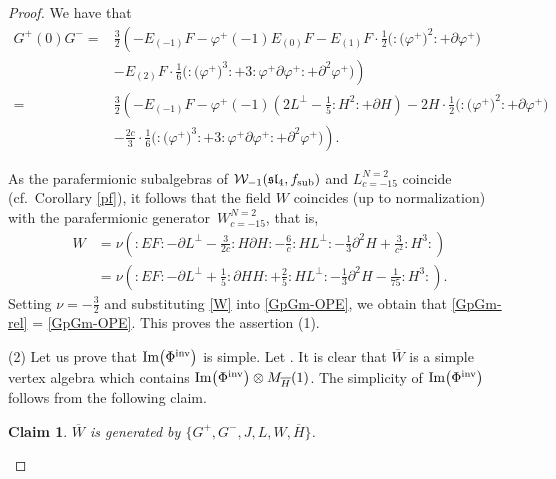 \documentclass[11pt]{article}
\numberwithin{equation}{section}
\newcommand{\F}{\mathcal F}
\newtheorem{Claim}[Theorem]{Claim}
\begin{document}
\begin{proof}
We have that
 \begin{align}
G^+(0) G^-={}& \frac{3}{2}\left(-E_{(-1)}F -\varphi^+(-1) E_{(0)}F - E_{(1)}F\cdot \frac{1}{2}\bigl({:}\bigl(\varphi^+\bigr)^2{:}+\partial \varphi^+\bigr) \right. \nonumber\\
&\left. - E_{(2)}F\cdot \frac{1}{6}\bigl({:} \bigl(\varphi^+ \bigr)^3 {:}+3{:}\varphi ^+ \partial \varphi^+{:} + \partial ^2 \varphi^+\bigr) \right) \nonumber\\
={}& \frac{3}{2}\left(-E_{(-1)}F -\varphi^+(-1) \left(2L^{\perp} - \frac{1}{5}{:}H^2{:} +\partial H\right) - 2H\cdot\frac{1}{2}\bigl({:}\bigl(\varphi^+\bigr)^2{:}+\partial \varphi^+\bigr) \right. \nonumber\\
&\left.- \frac{2c}{3}\cdot \frac{1}{6}\bigl({:}\bigl(\varphi^+\bigr)^3{:} + 3{:}\varphi^+ \partial \varphi^+{:} + \partial ^2 \varphi^+\bigr) \right) .  \label{GpGm-rel}
\end{align}




As the parafermionic subalgebras of $\mathcal W_{-1} (\mathfrak{sl}_4, f_{\rm sub})$ and $L^{N=2}_{c=-15} $ coincide (cf.\ Corollary \ref{pf}), it follows that the field $W$ coincides (up to normalization) with the parafermionic generator~$W^{N=2}_{c=-15}$, that is,
\begin{align}
	W	&= \nu \left({:}E F{:} - \partial L^{\perp} - \frac{3}{2c}{:}H\partial H{:} -\frac{6}{c}{:}HL^{\perp}{:}- \frac{1}{3}\partial^2H + \frac{3}{c^2}{:}H^3{:} \right) \nonumber \\
	&= \nu \left({:}E F{:} - \partial L^{\perp}+ \frac{1}{5}{:}\partial H H {:} + \frac{2}{5}{:}HL^{\perp}{:} -\frac{1}{3}\partial^2H - \frac{1}{75}{:}H^3{:} \right). \label{W}
\end{align}
Setting $\nu = -\frac{3}{2}$ and substituting \eqref{W} into \eqref{GpGm-OPE}, we obtain that \eqref{GpGm-rel} = \eqref{GpGm-OPE}.
This proves the assertion (1).

(2) Let us prove that $\operatorname{Im} \bigl(\Phi^{\rm inv}\bigr) $ is simple. Let \smash{$\overline{W} = \operatorname{Ker}_{ L^{N=2}_{c=-15} \otimes \F_{1}} \overline{H} (0)$}. It is clear that $\overline{W}$ is a simple vertex algebra which contains $ \operatorname{Im} \bigl(\Phi^{\rm inv}\bigr) \otimes M_{\overline{H}} (1)$. The simplicity of $ \operatorname{Im} \bigl(\Phi^{\rm inv}\bigr) $ follows from the following claim.

\begin{Claim}\label{Claim2}
$\overline W$ is generated by $\big\{ G^+, G^-, J, L, W, \overline{H} \big\}$.
\end{Claim}


\end{proof}
\end{document}
